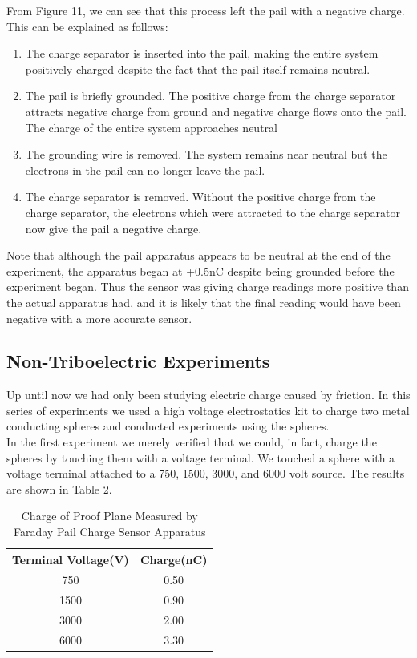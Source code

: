 \documentclass[12pt]{amsart}
\begin{document}
\indent From Figure 11, we can see that this process left the pail with a negative charge. This can be explained as follows:\\
\begin{enumerate}
	\item The charge separator is inserted into the pail, making the entire system positively charged despite the fact that the pail itself remains neutral.
	\item The pail is briefly grounded. The positive charge from the charge separator attracts negative charge from ground and negative charge flows onto the pail. The charge of the entire system approaches neutral
	\item The grounding wire is removed. The system remains near neutral but the electrons in the pail can no longer leave the pail.
	\item The charge separator is removed. Without the positive charge from the charge separator, the electrons which were attracted to the charge separator now give the pail a negative charge.
\end{enumerate}

\indent Note that although the pail apparatus appears to be neutral at the end of the experiment, the apparatus began at +0.5nC despite being grounded before the experiment began. Thus the sensor was giving charge readings more positive than the actual apparatus had, and it is likely that the final reading would have been negative with a more accurate sensor.

\subsection{Non-Triboelectric Experiments}
\indent Up until now we had only been studying electric charge caused by friction. In this series of experiments we used a high voltage electrostatics kit to charge two metal conducting spheres and conducted experiments using the spheres.\\
\indent In the first experiment we merely verified that we could, in fact, charge the spheres by touching them with a voltage terminal. We touched a sphere with a voltage terminal attached to a 750, 1500, 3000, and 6000 volt source. The results are shown in Table 2.\\
\begin{table}[H]
	\begin{tabular}{ |c|c|}
		\hline
		Terminal Voltage(V) & Charge(nC)\\
		\hline
		750&0.50\\
		1500&0.90\\
		3000&2.00\\
		6000&3.30\\
		\hline	
	\end{tabular}
	\caption{Charge of Proof Plane Measured by Faraday Pail Charge Sensor Apparatus}
\end{table}
\end{document}
